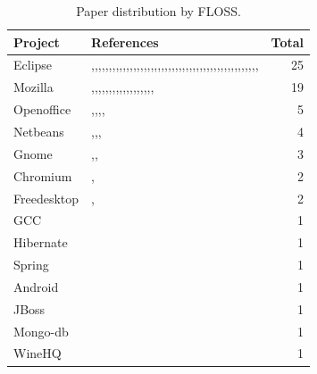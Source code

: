 \begin{table}[h!]
  \vspace{0pt}
  \centering
  \captionsetup{type=table}
  \caption{Paper distribution by FLOSS.}
  \small
  \begin{tabular}{@{}lp{10cm}r@{}}
    \toprule
    \textbf{Project} & \textbf{References} & \textbf{Total}\\
    \midrule
    Eclipse & \cite{Lamkanfi:2010},\cite{Lamkanfi:2011},\cite{Tian:2012},\cite{Yang:2012},\cite{Chaturvedi:2012},\cite{Yang:2014b},\cite{Yang:2014a},\cite{Valdivia:2014},\cite{Roy:2014},\cite{Saha:2015},\cite{Zhang:2015},\cite{Sharma:2015},\cite{Xia:2015},\cite{Gujral:2015},\cite{Otoom:2016},\cite{Sabor:2016},\cite{Tian:2016},\cite{Zhang:2016},\cite{Jin:2016a},\cite{Choeikiwong:2016},\cite{Jin:2016b},\cite{Jin:2016c},\cite{Yang:2017},\cite{Singh:2017},\cite{Roy:2017},\cite{Lamkanfi:2011},\cite{Tian:2012},\cite{Yang:2012},\cite{Chaturvedi:2012},\cite{Yang:2014b},\cite{Yang:2014a},\cite{Valdivia:2014},\cite{Roy:2014},\cite{Saha:2015},\cite{Zhang:2015},\cite{Sharma:2015},\cite{Xia:2015},\cite{Gujral:2015},\cite{Otoom:2016},\cite{Sabor:2016},\cite{Tian:2016},\cite{Zhang:2016},\cite{Jin:2016a},\cite{Choeikiwong:2016},\cite{Jin:2016b},\cite{Jin:2016c},\cite{Yang:2017},\cite{Singh:2017},\cite{Roy:2017} & 25 \\
    \midrule
    Mozilla & \cite{Lamkanfi:2010},\cite{Tian:2012},\cite{Yang:2012},\cite{Chaturvedi:2012},\cite{Yang:2014b},\cite{Valdivia:2014},\cite{Meera:2014},\cite{Roy:2014},\cite{Zhang:2015},\cite{Xia:2015},\cite{Pushpalathas:2016},\cite{Otoom:2016},\cite{Tian:2016},\cite{Zhang:2016},\cite{Jin:2016a},\cite{Jin:2016b},\cite{Jin:2016c},\cite{Singh:2017},\cite{Roy:2017} & 19 \\
    \midrule
    Openoffice & \cite{Tian:2012},\cite{Valdivia:2014},\cite{Xia:2015},\cite{Tian:2016},\cite{Zhang:2016} & 5 \\
    \midrule
    Netbeans & \cite{Yang:2014b},\cite{Valdivia:2014},\cite{Xia:2015},\cite{Zhang:2016} & 4 \\
    \midrule
    Gnome & \cite{Lamkanfi:2010},\cite{Lamkanfi:2011},\cite{Chaturvedi:2012} & 3 \\
    \midrule
    Chromium & \cite{Valdivia:2014},\cite{Xia:2015} & 2 \\
    Freedesktop & \cite{Valdivia:2014},\cite{Xia:2015} & 2 \\
    \midrule
    GCC & \cite{Zhang:2016} & 1 \\
    \midrule
    Hibernate & \cite{Roy:2017} & 1 \\
    \midrule
    Spring & \cite{Roy:2017} & 1 \\
    \midrule
    Android & \cite{Yang:2017} & 1 \\
    \midrule
    JBoss & \cite{Yang:2017} & 1 \\
    \midrule
    Mongo-db & \cite{Roy:2017} & 1 \\
    \midrule
    WineHQ & \cite{Pushpalathas:2016} & 1 \\
    \bottomrule
  \end{tabular} 
  \label{tab:papers_by_floss}  
\end{table} 

